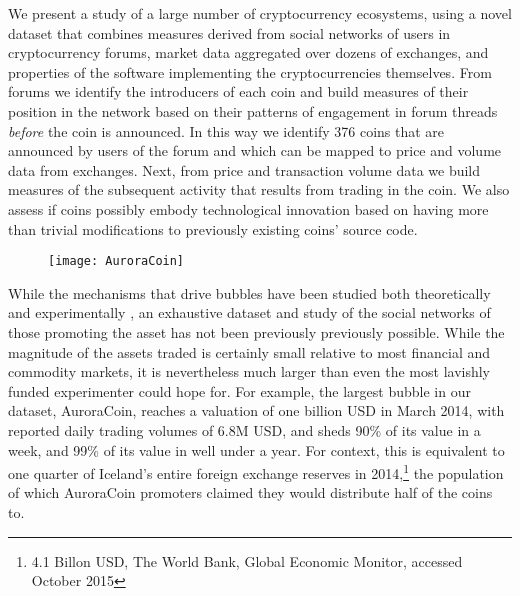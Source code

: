 
We present a study of a large number of cryptocurrency ecosystems, 
using a novel dataset that combines measures derived from social networks of users in cryptocurrency forums, market data aggregated over dozens of exchanges, and properties of the software implementing the cryptocurrencies themselves.
From forums we identify the introducers of each coin and build measures of their position in the network based on
their patterns of engagement in forum threads
\emph{before} the coin is announced.
In this way we identify 376 coins that are announced by users of the forum and which can be mapped to price and volume data from exchanges.
Next, from price and transaction volume data we build measures of the subsequent activity that results from trading in the coin. 
We also assess if coins possibly embody technological innovation based on having more than trivial modifications to previously existing coins' source code.


\begin{figure}
\texttt{[image: AuroraCoin]}
\end{figure}

While the mechanisms that drive bubbles have been studied both theoretically 
\cite{abolafia1988enacting, earl2007decision, bakker2010social, harras2011grow}
and experimentally
\cite{moinas2013bubble},
an exhaustive dataset and study of the social networks of those promoting the asset has not been previously previously possible.
While the magnitude of the assets traded is certainly small relative to most financial and commodity markets, it is nevertheless much larger than
even the most lavishly funded experimenter could hope for.
For example, the largest bubble in our dataset, AuroraCoin, reaches a valuation of one billion USD in March 2014,
with reported daily trading volumes of 6.8M USD, and sheds 90\% of its value in a week, and 99\% of its value in well under a year.
For context, this is equivalent to one quarter of Iceland's entire foreign exchange reserves in 2014,\footnote{4.1 Billon USD, The World Bank, Global Economic Monitor, accessed October 2015} the population of which AuroraCoin promoters claimed they would distribute half of the coins to.


